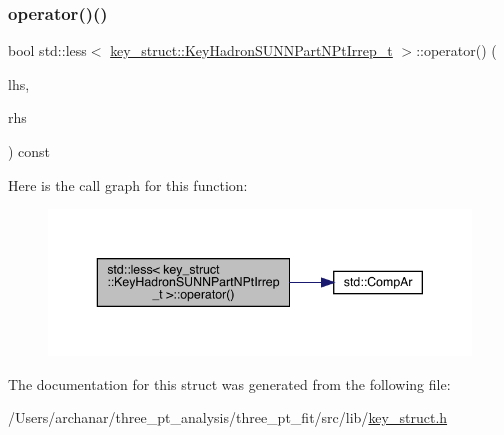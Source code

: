 \subsubsection{\texorpdfstring{operator()()}{operator()()}}
{\footnotesize\ttfamily bool std\+::less$<$ \mbox{\hyperlink{structkey__struct_1_1KeyHadronSUNNPartNPtIrrep__t}{key\+\_\+struct\+::\+Key\+Hadron\+S\+U\+N\+N\+Part\+N\+Pt\+Irrep\+\_\+t}} $>$\+::operator() (\begin{DoxyParamCaption}\item[{const \mbox{\hyperlink{structkey__struct_1_1KeyHadronSUNNPartNPtIrrep__t}{key\+\_\+struct\+::\+Key\+Hadron\+S\+U\+N\+N\+Part\+N\+Pt\+Irrep\+\_\+t}} \&}]{lhs,  }\item[{const \mbox{\hyperlink{structkey__struct_1_1KeyHadronSUNNPartNPtIrrep__t}{key\+\_\+struct\+::\+Key\+Hadron\+S\+U\+N\+N\+Part\+N\+Pt\+Irrep\+\_\+t}} \&}]{rhs }\end{DoxyParamCaption}) const\hspace{0.3cm}{\ttfamily [inline]}}

Here is the call graph for this function\+:
\nopagebreak
\begin{figure}[H]
\begin{center}
\leavevmode
\includegraphics[width=343pt]{da/d48/structstd_1_1less_3_01key__struct_1_1KeyHadronSUNNPartNPtIrrep__t_01_4_a3777310df409b732027553da6b929380_cgraph}
\end{center}
\end{figure}


The documentation for this struct was generated from the following file\+:\begin{DoxyCompactItemize}
\item 
/\+Users/archanar/three\+\_\+pt\+\_\+analysis/three\+\_\+pt\+\_\+fit/src/lib/\mbox{\hyperlink{key__struct_8h}{key\+\_\+struct.\+h}}\end{DoxyCompactItemize}
